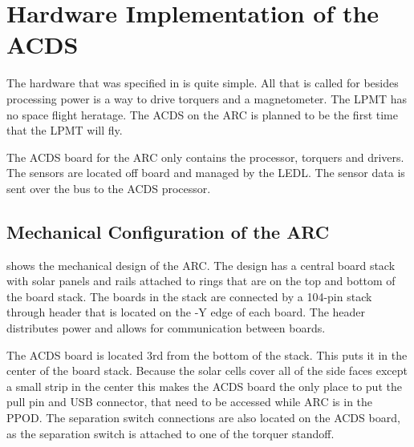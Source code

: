 
\chapter{Hardware Implementation of the \acf{ACDS}}\label{ch:CubeSatHardware}

The hardware that was specified in \cite{Mentch11} is quite simple. All that is called for besides processing power is a way to drive torquers and a magnetometer. The \ac{LPMT} has no space flight heratage. The \ac{ACDS} on the \ac{ARC} is planned to be the first time that the \ac{LPMT} will fly.

The \ac{ACDS} board for the \ac{ARC} only contains the processor, torquers and drivers. The sensors are located off board and managed by the \ac{LEDL}. The sensor data is sent over the bus to the \ac{ACDS} processor. 


\section{Mechanical Configuration of the \acf{ARC}}

 shows the mechanical design of the \ac{ARC}. The design has a central board stack with solar panels and rails attached to rings that are on the top and bottom of the board stack. The boards in the stack are connected by a 104-pin stack through header that is located on the -Y edge of each board. The header distributes power and allows for communication between boards. 

The \ac{ACDS} board is located 3rd from the bottom of the stack. This puts it in the center of the board stack. Because the solar cells cover all of the side faces except a small strip in the center this makes the \ac{ACDS} board the only place to put the pull pin and \ac{USB} connector, that need to be accessed while \ac{ARC} is in the \ac{PPOD}. The separation switch connections are also located on the \ac{ACDS} board, as the separation switch is attached to one of the torquer standoff.


